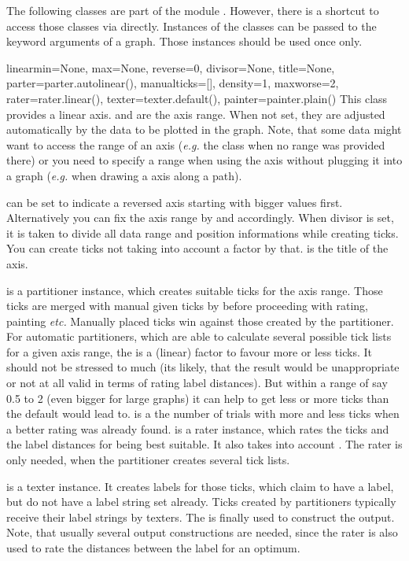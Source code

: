 The following classes are part of the module .
However, there is a shortcut to access those classes via
 directly. Instances of the classes can be passed to
the  keyword arguments of a graph. Those instances should
be used once only.

\begin{classdesc}{linear}{min=None, max=None, reverse=0, divisor=None, title=None,
                          parter=parter.autolinear(), manualticks=[],
                          density=1, maxworse=2, rater=rater.linear(),
                          texter=texter.default(), painter=painter.plain()}
  This class provides a linear axis.  and  are the
  axis range. When not set, they are adjusted automatically by the
  data to be plotted in the graph. Note, that some data might want to
  access the range of an axis (\emph{e.g.} the  class
  when no range was provided there) or you need to specify a range
  when using the axis without plugging it into a graph (\emph{e.g.}
  when drawing a axis along a path).

   can be set to indicate a reversed axis starting with
  bigger values first. Alternatively you can fix the axis range by
   and  accordingly. When divisor is set, it is
  taken to divide all data range and position informations while
  creating ticks. You can create ticks not taking into account a
  factor by that.  is the title of the axis.

   is a partitioner instance, which creates suitable ticks
  for the axis range. Those ticks are merged with manual given ticks
  by  before proceeding with rating, painting
  \emph{etc.} Manually placed ticks win against those created by the
  partitioner. For automatic partitioners, which are able to calculate
  several possible tick lists for a given axis range, the
   is a (linear) factor to favour more or less ticks. It
  should not be stressed to much (its likely, that the result would be
  unappropriate or not at all valid in terms of rating label
  distances). But within a range of say 0.5 to 2 (even bigger for
  large graphs) it can help to get less or more ticks than the default
  would lead to.  is a the number of trials with more
  and less ticks when a better rating was already found. 
  is a rater instance, which rates the ticks and the label distances
  for being best suitable. It also takes into account .
  The rater is only needed, when the partitioner creates several tick
  lists.

   is a texter instance. It creates labels for those
  ticks, which claim to have a label, but do not have a label string
  set already. Ticks created by partitioners typically receive their
  label strings by texters. The  is finally used to
  construct the output. Note, that usually several output
  constructions are needed, since the rater is also used to rate the
  distances between the label for an optimum.
\end{classdesc}

